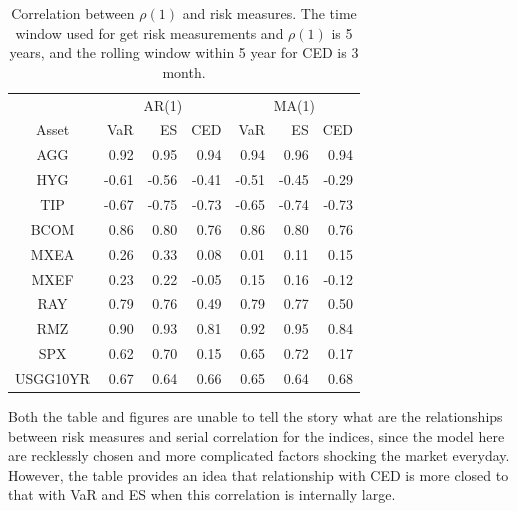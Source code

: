 \documentclass[11pt]{article}
\begin{document}
\begin{table}[H]
\centering 
\begin{tabular}{ | c || r r r|| r r r | } 
 \hline
 &\multicolumn{3}{c|}{AR(1)} &\multicolumn{3}{c|}{MA(1)} \\
 \cline{2-7}
Asset & VaR  & ES & CED & VaR  & ES & CED \\
  \hline \hline
AGG & 0.92 & 0.95 & 0.94  & 0.94 & 0.96 & 0.94  \\ 
HYG & -0.61 & -0.56 &  -0.41 & -0.51 & -0.45 &  -0.29  \\ 
TIP & -0.67 & -0.75 &  -0.73 & -0.65 & -0.74 &  -0.73\\ 
BCOM & 0.86 & 0.80 & 0.76 & 0.86 & 0.80 & 0.76\\ 
MXEA & 0.26 & 0.33 & 0.08& 0.01 & 0.11 & 0.15 \\ 
MXEF & 0.23 & 0.22 & -0.05& 0.15 & 0.16 & -0.12  \\ 
RAY & 0.79 & 0.76 & 0.49 & 0.79 & 0.77 & 0.50 \\ 
RMZ & 0.90 & 0.93 &  0.81 & 0.92 & 0.95 &  0.84\\ 
SPX & 0.62 & 0.70 & 0.15 & 0.65 & 0.72 & 0.17\\ 
USGG10YR & 0.67 & 0.64 &  0.66 & 0.65 & 0.64 &  0.68\\
 \hline
\end{tabular}
\caption{Correlation between $\rho(1)$ and risk measures. The time window used for get risk measurements and $\rho(1)$ is 5 years, and the rolling window within 5 year for CED is 3 month.}
\label{table:corSerialRisk}
\end{table}

Both the table and figures are unable to tell the story what are the relationships between risk measures and serial correlation for the indices, since the model here are recklessly chosen and more complicated factors shocking the market everyday. However, the table provides an idea that relationship with CED is more closed to that with VaR and ES when this correlation is internally large.
\end{document}
